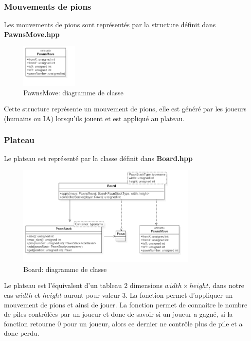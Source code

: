 \documentclass[article, backcover, french, nodocumentinfo]{upmethodology-document}
\begin{document}
			\subsubsection{Mouvements de pions}
					Les mouvements de pions sont représentés par la structure  définit dans \textbf{PawnsMove.hpp}
					\begin{figure}[H]
						\centering
						\includegraphics[width=0.25\textwidth]{figures/PawnsMoveDiagram}
						\caption{PawnsMove: diagramme de classe}
						\label{fig:PawnsMoveDiagram}
					\end{figure}
					Cette structure représente un mouvement de pions, elle est généré par les joueurs (humains ou IA) lorsqu’ils jouent et est appliqué au plateau.
			\subsubsection{Plateau}
					Le plateau est représenté par la classe  définit dans \textbf{Board.hpp}
					\begin{figure}[H]
						\centering
						\includegraphics[width=0.8\textwidth]{figures/BoardDiagram}
						\caption{Board: diagramme de classe}
						\label{fig:BoardDiagram}
					\end{figure}
					Le plateau est l'équivalent d'un tableau 2 dimensions $width \times height$, dans notre cas $width$ et $height$ auront pour valeur 3.
					La fonction  permet d'appliquer un mouvement de pions et ainsi de jouer. La fonction  permet de connaitre le nombre de piles contrôlées par un joueur et donc de savoir si un joueur a gagné, si la fonction retourne 0 pour un joueur, alors ce dernier ne contrôle plus de pile et a donc perdu.
\end{document}
